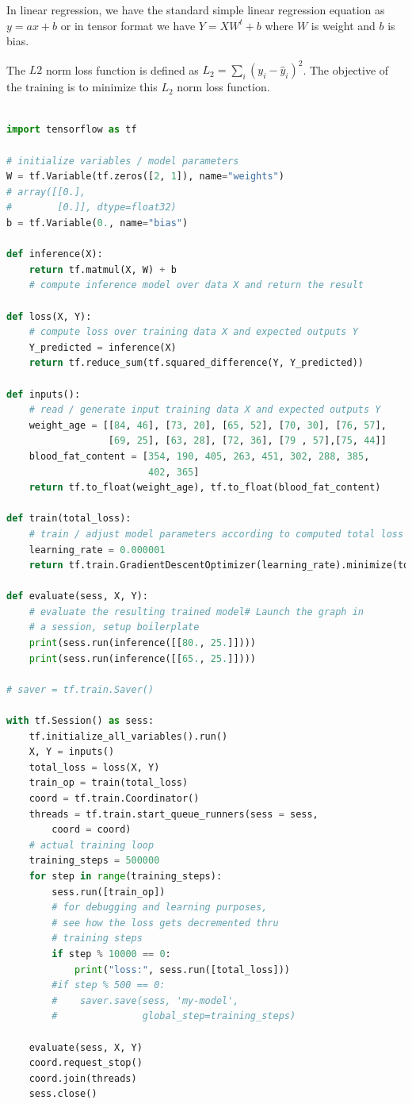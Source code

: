 \documentclass[vecarrow]{svproc}
\begin{document}
In linear regression, we have the standard simple linear regression equation as
$ y = ax + b $ or in tensor format we have $ Y = XW^t + b$ where $W$ is weight and
$b$ is bias.

The $L2$ norm loss function is defined as $ L_2 = \sum_i (y_i - \hat{y}_i)^2$. The
objective of the training is to minimize this $L_2$ norm loss function.

\begin{lstlisting}[language=Python,
caption={linear regression in tensor},label={list8}]

import tensorflow as tf

# initialize variables / model parameters
W = tf.Variable(tf.zeros([2, 1]), name="weights")
# array([[0.],
#        [0.]], dtype=float32)
b = tf.Variable(0., name="bias")

def inference(X):
    return tf.matmul(X, W) + b
    # compute inference model over data X and return the result

def loss(X, Y):
    # compute loss over training data X and expected outputs Y
    Y_predicted = inference(X)
    return tf.reduce_sum(tf.squared_difference(Y, Y_predicted))

def inputs():
    # read / generate input training data X and expected outputs Y
    weight_age = [[84, 46], [73, 20], [65, 52], [70, 30], [76, 57],
                  [69, 25], [63, 28], [72, 36], [79 , 57],[75, 44]]
    blood_fat_content = [354, 190, 405, 263, 451, 302, 288, 385,
                         402, 365]
    return tf.to_float(weight_age), tf.to_float(blood_fat_content)

def train(total_loss):
    # train / adjust model parameters according to computed total loss
    learning_rate = 0.000001
    return tf.train.GradientDescentOptimizer(learning_rate).minimize(total_loss)

def evaluate(sess, X, Y):
    # evaluate the resulting trained model# Launch the graph in
    # a session, setup boilerplate
    print(sess.run(inference([[80., 25.]])))
    print(sess.run(inference([[65., 25.]])))

# saver = tf.train.Saver()

with tf.Session() as sess:
    tf.initialize_all_variables().run()
    X, Y = inputs()
    total_loss = loss(X, Y)
    train_op = train(total_loss)
    coord = tf.train.Coordinator()
    threads = tf.train.start_queue_runners(sess = sess,
        coord = coord)
    # actual training loop
    training_steps = 500000
    for step in range(training_steps):
        sess.run([train_op])
        # for debugging and learning purposes,
        # see how the loss gets decremented thru
        # training steps
        if step % 10000 == 0:
            print("loss:", sess.run([total_loss]))
        #if step % 500 == 0:
        #    saver.save(sess, 'my-model',
        #               global_step=training_steps)

    evaluate(sess, X, Y)
    coord.request_stop()
    coord.join(threads)
    sess.close()
\end{lstlisting}
\end{document}
